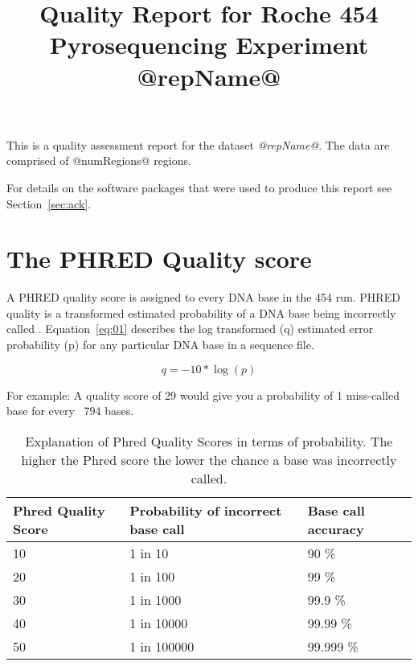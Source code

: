 \documentclass[11pt]{article}
\begin{document}
\title{Quality Report for Roche 454 Pyrosequencing Experiment 
\\
@repName@}
\date{}

\maketitle
\tableofcontents

\vspace{1.08cm}
This is a quality assessment report for the dataset \textit{@repName@}.  
The data are comprised of @numRegions@ regions.

For details on the software packages that were used to produce this
report see Section~\ref{sec:ack}.

\section{The PHRED Quality score}

A PHRED quality score is assigned to every DNA base in the 454 run. PHRED quality is a transformed estimated probability of a DNA base being incorrectly called \citep{Ewing1998a,Ewing1998b}. 
Equation~\ref{eq:01} describes the log transformed (q) estimated error probability (p) for any particular DNA base in a sequence file.    

\begin{equation}
q = -10*\log(p)  \label{eq:01}
\end{equation}

For example: A quality score of 29 would give you a probability of 1 miss-called base for every ~794 bases.  


\begin{table}
\begin{tabular}{|l|l|l|}
\hline
Phred Quality Score & Probability of incorrect base call & Base call accuracy \\
\hline
 10 & 1 in 10 & 90 \%  \\
\hline
 20 & 1 in 100 & 99 \%  \\
\hline
 30 & 1 in 1000 & 99.9 \%  \\
\hline
 40 & 1 in 10000 & 99.99 \%  \\
\hline
 50 & 1 in 100000 & 99.999 \%  \\
\hline
\end{tabular}
\caption{Explanation of Phred Quality Scores in terms of probability.  The higher the Phred score the lower the chance a base was incorrectly called.}
\end{table}
\end{document}
